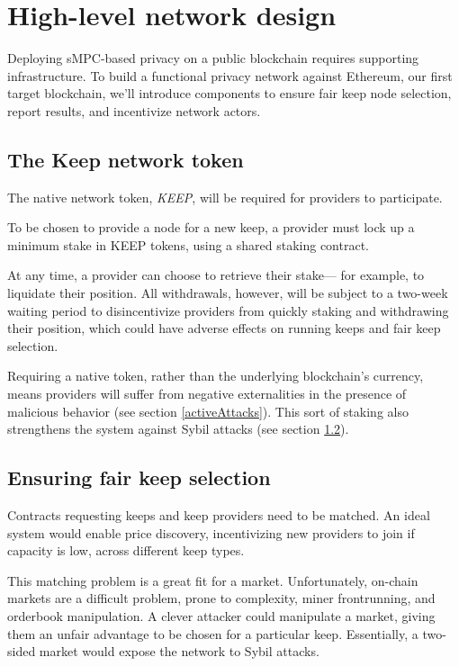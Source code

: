 \documentclass[11pt]{article}
\begin{document}
\section{High-level network design}

Deploying sMPC-based privacy on a public blockchain requires
supporting infrastructure. To build a functional privacy network
against Ethereum, our first target blockchain, we'll introduce
components to ensure fair keep node selection, report results, and
incentivize network actors.

\subsection{The Keep network token}

The native network token, \textit{KEEP}, will be required for
providers to participate.

To be chosen to provide a node for a new keep, a provider must lock up
a minimum stake in KEEP tokens, using a shared staking contract.

At any time, a provider can choose to retrieve their stake--- for
example, to liquidate their position. All withdrawals, however, will
be subject to a two-week waiting period to disincentivize providers from
quickly staking and withdrawing their position, which could have
adverse effects on running keeps and fair keep selection.

Requiring a native token, rather than the underlying blockchain's
currency, means providers will suffer from negative externalities in
the presence of malicious behavior (see section \ref{activeAttacks}). This sort
of staking also strengthens the system against Sybil attacks (see section
\ref{fairKeepSelection}).

\subsection{Ensuring fair keep selection}
\label{fairKeepSelection}

Contracts requesting keeps and keep providers need to be matched. An
ideal system would enable price discovery, incentivizing new providers
to join if capacity is low, across different keep types.

This matching problem is a great fit for a market. Unfortunately,
on-chain markets are a difficult problem, prone to complexity, miner
frontrunning, and orderbook manipulation. A clever attacker could
manipulate a market, giving them an unfair advantage to be chosen for
a particular keep. Essentially, a two-sided market would expose the
network to Sybil attacks.
\end{document}
